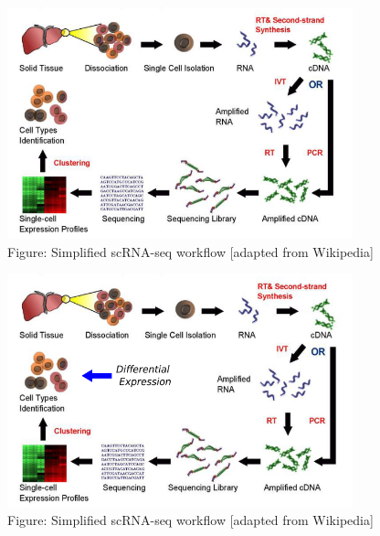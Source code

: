 \documentclass{beamer}\usepackage[]{graphicx}\usepackage[]{color}
\begin{document}
\begin{frame}
\begin{center}
\begin{figure}
\includegraphics[width=10cm]{Images/DE-overview-01.png}
\caption{Figure: Simplified scRNA-seq workflow [adapted from Wikipedia]}
\end{figure}
\end{center}
\end{frame}

\begin{frame}
\begin{center}
\begin{figure}
\includegraphics[width=10cm]{Images/DE-overview-02.png}
\caption{Figure: Simplified scRNA-seq workflow [adapted from Wikipedia]}
\end{figure}
\end{center}
\end{frame}
\end{document}

